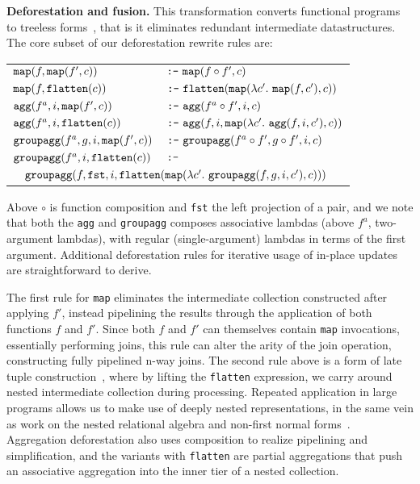 \vspace{1mm}
\noindent\textbf{Deforestation and fusion.} This transformation converts
functional programs to treeless forms~\cite{marlow-fp:92}, that is it eliminates
redundant intermediate datastructures. The core subset of our deforestation
rewrite rules are:

\def\xform{\mbox{\texttt{:-}}}
\def\fst{\mbox{\texttt{fst}}}

\vspace{1mm}\hspace{-6mm}
\begin{tabular}{p{3.6cm}l}
$\mbox{\texttt{map}}(f, \mbox{\texttt{map}}(f', c))$ 
    & $\xform\ \map(f \circ f', c)$
\\
$\mbox{\texttt{map}}(f, \mbox{\texttt{flatten}}(c))$
    & $\xform\ \flatten(\map(\lambda c'.\ \map(f,c'), c))$
\\
$\mbox{\texttt{agg}}(f^a, i, \mbox{\texttt{map}}(f', c))$
    & $\xform\ \agg(f^a \circ f', i, c)$
\\
$\mbox{\texttt{agg}}(f^a, i, \mbox{\texttt{flatten}}(c))$
    & $\xform\ \agg(f, i, \map(\lambda c'.\ \agg(f, i, c'),c))$
\\
$\mbox{\texttt{groupagg}}(f^a, g, i, \mbox{\texttt{map}}(f', c))$
    & $\xform\ \groupagg(f^a \circ f', g \circ f', i, c)$
\\
$\mbox{\texttt{groupagg}}(f^a, i, \mbox{\texttt{flatten}}(c))$ & $\xform$
\\
\multicolumn{2}{l}{
$\quad\groupagg(f, \fst, i, \flatten(
    \map(\lambda c'.\ \groupagg(f, g, i, c'),c)))$}
\end{tabular}


\vspace{1mm}
Above $\circ$ is function composition and \texttt{fst} the left projection of a
pair, and we note that both the \texttt{agg} and \texttt{groupagg} composes
associative lambdas (above $f^a$, two-argument lambdas), with regular
(single-argument) lambdas in terms of the first argument. Additional
deforestation rules for iterative usage of in-place updates are
straightforward to derive.

The first rule for \texttt{map} eliminates the intermediate collection
constructed after applying $f'$, instead pipelining the results through the
application of both functions $f$ and $f'$. Since both $f$ and $f'$ can
themselves contain \texttt{map} invocations, essentially performing joins, this
rule can alter the arity of the join operation, constructing fully pipelined
n-way joins. The second rule above is a form of late tuple
construction~\cite{abadi-icde:07}, where by lifting the \texttt{flatten}
expression, we carry around nested intermediate collection during processing.
Repeated application in large programs allows us to make use of deeply nested
representations, in the same vein as work on the nested relational algebra and
non-first normal forms~\cite{schek-infsys:86}. Aggregation deforestation also
uses composition to realize pipelining and simplification, and the variants with
\texttt{flatten} are partial aggregations that push an associative aggregation
into the inner tier of a nested collection.

